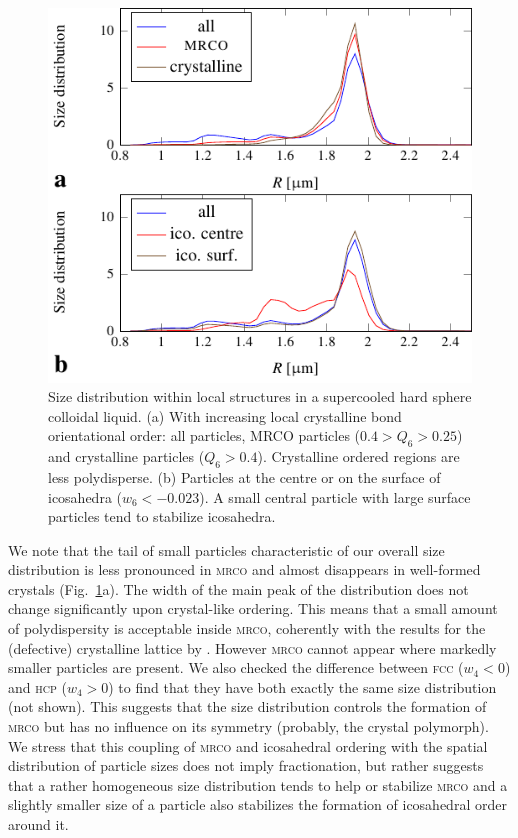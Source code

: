 \documentclass[8.5pt,twoside,twocolumn]{article}
\begin{document}
\begin{figure}
	\centering
	\includegraphics{fig_size_struc.pdf}
	\caption{Size distribution within local structures in a supercooled hard sphere colloidal liquid. (a) With increasing local crystalline bond orientational order: all particles, MRCO particles ($0.4>Q_6>0.25$) and crystalline particles ($Q_6>0.4$). Crystalline ordered regions are less polydisperse. (b) Particles at the centre or on the surface of icosahedra ($w_6<-0.023$). A small central particle with large surface particles tend to stabilize icosahedra.}
	\label{fig:size_struc}
\end{figure}

We note that the tail of small particles characteristic of our overall size distribution is less pronounced in \textsc{mrco} and almost disappears in well-formed crystals (Fig.~\ref{fig:size_struc}a). The width of the main peak of the distribution does not change significantly upon crystal-like ordering. This means that a small amount of polydispersity is acceptable inside \textsc{mrco}, coherently with the results for the (defective) crystalline lattice by \citet{Fasolo2003}. However \textsc{mrco} cannot appear where markedly smaller particles are present. We also checked the difference between \textsc{fcc} ($w_4<0$) and \textsc{hcp} ($w_4>0$) to find that they have both exactly the same size distribution (not shown). This suggests that the size distribution controls the formation of \textsc{mrco} but has no influence on its symmetry (probably, the crystal 
polymorph). 
We stress that this coupling of \textsc{mrco} and icosahedral ordering with the spatial distribution of particle sizes does not imply fractionation, but rather suggests
that a rather homogeneous size distribution tends to help or stabilize \textsc{mrco} and a slightly smaller size of a particle also stabilizes the formation of icosahedral order 
around it.   
\end{document}
